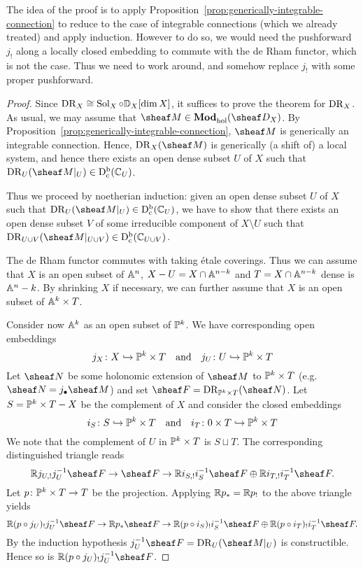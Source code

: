 \documentclass[number-in-sections,a4paper]{notes}
\begin{document}
The idea of the proof is to apply Proposition~\ref{prop:generically-integrable-connection} to reduce to the case of integrable connections (which we already treated) and apply induction.
However to do so, we would need the pushforward $j_!$ along a locally closed embedding to commute with the de Rham functor, which is not the case.
Thus we need to work around, and somehow replace $j_!$ with some proper pushforward.

\begin{proof}
    Since $\operatorname{DR}_X \cong \operatorname{Sol}_X \circ \mathbb{D}_X[\dim X]$, it suffices to prove the theorem for $\operatorname{DR}_X$.
    As usual, we may assume that $\sheaf M \in \catDModhol{X}$.
    By Proposition~\ref{prop:generically-integrable-connection}, $\sheaf M$ is generically an integrable connection.
    Hence, $\DR_X(\sheaf M)$ is generically (a shift of) a local system, and hence there exists an open dense subset $U$ of $X$ such that $\DR_U(\res{\sheaf M}{U}) \in \catDbConstr{U}$.

    Thus we proceed by noetherian induction: given an open dense subset $U$ of $X$ such that $\DR_U(\res{\sheaf M}U) \in \catDbConstr{U}$, we have to show that there exists an open dense subset $V$ of some irreducible component of $X \setminus U$ such that $\DR_{U\cup V}(\res{\sheaf M}{U \cup V}) \in \catDbConstr{U \cup V}$.

    The de Rham functor commutes with taking \'etale coverings.
    Thus we can assume that $X$ is an open subset of $\mathbb A^{n}_{}$, $X - U = X \cap \mathbb A^{n-k}_{}$ and $T = X \cap \mathbb A^{n-k}_{}$ dense is $\mathbb A^{n}_{}-k$.
    By shrinking $X$ if necessary, we can further assume that $X$ is an open subset of $\mathbb A^{k}_{} \times T$.

    Consider now $\mathbb A^{k}_{}$ as an open subset of $\mathbb P^{k}_{}$.
    We have corresponding open embeddings
    \[
        j_X\colon X \hookrightarrow \mathbb P^{k}_{} \times T
        \quad\text{and}\quad
        j_U\colon U \hookrightarrow \mathbb P^{k}_{} \times T
    \]
    Let $\sheaf N$ be some holonomic extension of $\sheaf M$ to $\mathbb P^{k}_{} \times T$ (e.g.~$\sheaf N = j_\bullet \sheaf M$) and set $\sheaf F = \DR_{\ps k \times T}(\sheaf N)$.
    Let $S = \mathbb P^{k}_{} \times T - X$ be the complement of $X$ and consider the closed embeddings
    \[
        i_S\colon S \hookrightarrow \mathbb P^{k}_{} \times T
        \quad\text{and}\quad
        i_T\colon 0 \times T \hookrightarrow \mathbb P^{k}_{} \times T
    \]
    We note that the complement of $U$ in $\mathbb P^{k}_{} \times T$ is $S \sqcup T$.
    The corresponding distinguished triangle reads
    \[
        \RR j_{U,!}j_U^{-1} \sheaf F 
        \to
        \sheaf F
        \to
        \RR i_{S,!}i_S^{-1} \sheaf F \oplus \RR i_{T,!}i_T^{-1} \sheaf F.
    \]
    Let $p\colon \mathbb P^{k}_{} \times T \to T$ be the projection.
    Applying ${\mathbb{R}} p_* = {\mathbb{R}} p_!$ to the above triangle yields
    \[
        \RR (p \circ j_U)_!j_U^{-1} \sheaf F 
        \to
        \RR p_* \sheaf F
        \to
        \RR (p \circ i_{S})_!i_S^{-1} \sheaf F \oplus \RR ( p \circ i_T)_!i_T^{-1} \sheaf F.
    \]
    By the induction hypothesis $j_U^{-1}\sheaf F = \DR_{U}(\res{\sheaf M}U)$ is constructible.
    Hence so is $\RR (p \circ j_U)_!j_U^{-1} \sheaf F$.


\end{proof}
\end{document}
